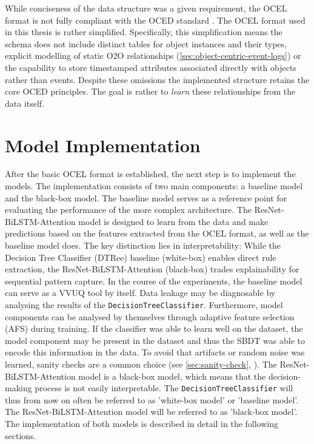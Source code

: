While conciseness of the data structure was a given requirement, the OCEL format is not fully compliant with the OCED standard \autocite{van2023object}. The OCEL format used in this thesis is rather simplified. Specifically, this simplification means the schema does not include distinct tables for object instances and their types, explicit modelling of static O2O relationships (\autoref{sec:object-centric-event-logs}) or the capability to store timestamped attributes associated directly with objects rather than events. Despite these omissions the implemented structure retains the core OCED principles. The goal is rather to \textit{learn} these relationships from the data itself.

\section{Model Implementation}

After the basic OCEL format is established, the next step is to implement the models. The implementation consists of two main components: a baseline model and the black-box model. The baseline model serves as a reference point for evaluating the performance of the more complex architecture. The ResNet-BiLSTM-Attention model is designed to learn from the data and make predictions based on the features extracted from the OCEL format, as well as the baseline model does. The key distinction lies in interpretability: While the Decision Tree Classifier (DTRee) baseline (white-box) enables direct rule extraction, the ResNet-BiLSTM-Attention (black-box) trades explainability for sequential pattern capture. In the course of the experiments, the baseline model can serve as a VVUQ tool by itself. Data leakage may be diagnosable by analysing the results of the \texttt{DecisionTreeClassifier}. Furthermore, model components can be analysed by themselves through adaptive feature selection (AFS) during training. If the classifier was able to learn well on the dataset, the model component may be present in the dataset and thus the SBDT was able to encode this information in the data. To avoid that artifacts or random noise was learned, sanity checks are a common choice (see \autoref{sec:sanity-check}, \autocite{adebayo2018sanity}). The ResNet-BiLSTM-Attention model is a black-box model, which means that the decision-making process is not easily interpretable. The \texttt{DecisionTreeClassifier} will thus from now on often be referred to as 'white-box model' or 'baseline model'. The ResNet-BiLSTM-Attention model will be referred to as 'black-box model'. The implementation of both models is described in detail in the following sections.

